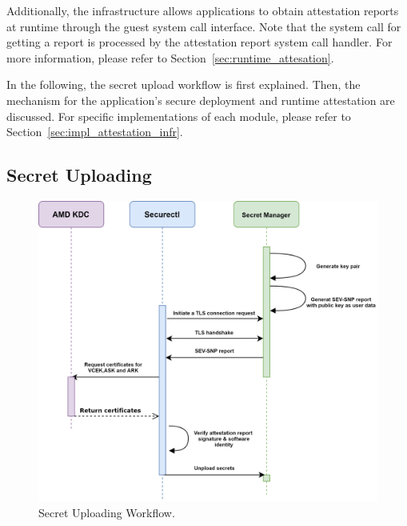 Additionally, the infrastructure allows applications to obtain attestation reports at runtime through the guest system call interface. Note that the system call for getting a report is processed by the attestation report system call handler. For more information, please refer to Section~\ref{sec:runtime_attesation}.

In the following, the secret upload workflow is first explained. Then, the mechanism for the application’s secure deployment and runtime attestation are discussed. For specific implementations of each module, please refer to Section~\ref{sec:impl_attestation_infr}.



\subsection{Secret Uploading}
\label{sec:design_Secret_Uploading}
\begin{figure}[!htb]
    \centering
    \includegraphics[height=0.4\textheight]{images/upload_secret.png}
    \caption[Secret Uploading Workflow]{Secret Uploading Workflow.}
    \label{fig:upload_secret}
\end{figure}

